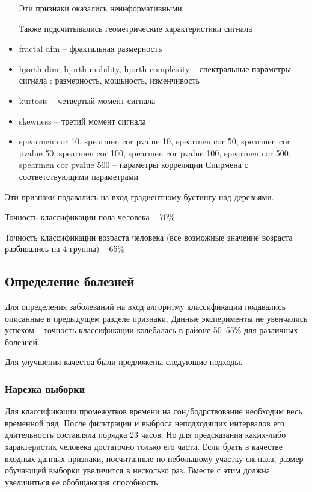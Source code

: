 \begin{itemize}
	Эти признаки оказались неинформативными.
	
	Также подсчитывались геометрические характеристики сигнала
	
	\item fractal dim -- фрактальная размерность
	\item hjorth dim, hjorth mobility, hjorth complexity -- спектральные параметры сигнала : размерность, мощьность, изменчивость
	\item kurtosis -- четвертый момент сигнала
	\item skewness -- третий момент сигнала
	\item spearmen cor 10, spearmen cor pvalue 10, spearmen cor 50, spearmen cor pvalue 50	
	,spearmen cor 100, spearmen cor pvalue 100, spearmen cor 500, spearmen cor pvalue 500 -- 
	параметры корреляции Спирмена с соответствующими параметрами
\end{itemize}

Эти признаки подавались на вход градиентному бустингу над деревьями. 

Точность классификации пола человека -- 70\%.

Точность классификации возраста человека (все возможные значение возраста разбивались на 4 группы) -- 65\%


\subsection{Определение болезней}

Для определения заболеваний на вход алгоритму классификации подавались описанные в предыдущем разделе признаки. Данные эксперименты не увенчались успехом -- точность классификации колебалась в районе 50--55\% для различных болезней.

Для улучшения качества были предложены следующие подходы.

\subsubsection{Нарезка выборки}
Для классификации промежутков времени на сон/бодрствование необходим весь временной ряд. После фильтрации и выброса неподходящих интервалов его длительность составляла порядка 23 часов. Но для предсказания каких-либо характеристик человека достаточно только его части. Если брать в качестве входных данных признаки, посчитанные по небольшому участку сигнала, размер обучающей выборки увеличится в несколько раз. Вместе с этим должна увеличиться ее обобщающая способность.

